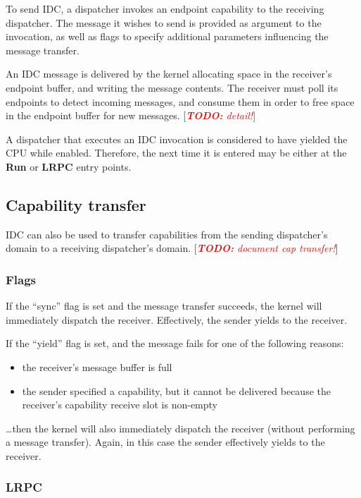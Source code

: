 \documentclass{scrreprt}
\newcommand{\note}[1]{ [\textcolor{red}{\emph{#1}}]}
\newcommand{\todo}[1]{\note{\textbf{TODO:} #1}}
\begin{document}
  To send IDC, a dispatcher invokes an endpoint capability to the
  receiving dispatcher. The message it wishes to send is provided as
  argument to the invocation, as well as flags to specify additional
  parameters influencing the message transfer.

  An IDC message is delivered by the kernel allocating space in the receiver's
  endpoint buffer, and writing the message contents. The receiver must poll its
  endpoints to detect incoming messages, and consume them in order to free space
  in the endpoint buffer for new messages. \todo{detail!}

  A dispatcher that executes an IDC invocation is considered to have
  yielded the CPU while enabled. Therefore, the next time it is
  entered may be either at the \textbf{Run} or \textbf{LRPC} entry
  points.

  \subsection{Capability transfer}

  IDC can also be used to transfer capabilities from the sending dispatcher's
  domain to a receiving dispatcher's domain.\todo{document cap transfer!}

  \subsubsection{Flags}

  If the ``sync'' flag is set and the message transfer succeeds, the kernel
  will immediately dispatch the receiver. Effectively, the sender yields to the
  receiver.

  If the ``yield'' flag is set, and the message fails for one of the following reasons:
  \begin{itemize}
   \item the receiver's message buffer is full
   \item the sender specified a capability, but it cannot be delivered because the 
     receiver's capability receive slot is non-empty
  \end{itemize}
  \ldots then the kernel will also immediately dispatch the receiver (without 
  performing a message transfer). Again, in this case the sender effectively yields
  to the receiver.

  \subsubsection{LRPC}
\end{document}
